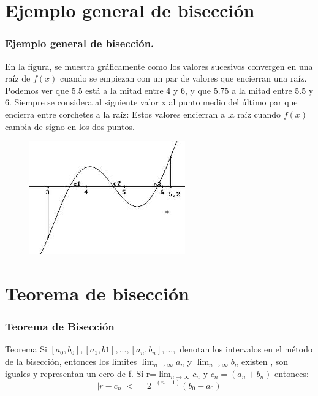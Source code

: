 \documentclass{beamer}
\begin{document}
\section{Ejemplo general de bisección}

\begin{frame}
\frametitle{Ejemplo general de bisección.}

\begin{block}{}
En la figura, se muestra gráficamente como los valores sucesivos convergen en una raíz de $f(x)$ cuando se empiezan con un par de valores que encierran una raíz. Podemos ver que 5.5 está a la mitad entre 4 y 6, y que 5.75 a la mitad entre 5.5 y 6. Siempre se considera al siguiente valor x al punto medio del último par que encierra entre corchetes a la raíz: Estos valores encierran a la raíz cuando $f(x)$ cambia de signo en los dos puntos.
\end{block}

\begin{figure}[b]
\begin{center}
\includegraphics[scale=0.4]{images.jpeg}
\end{center}
\end{figure}

\end{frame}

\section{Teorema de bisección}

\begin{frame}
\frametitle{Teorema de Bisección}
\begin{block}{Teorema}
Si $[a_0, b_0],[a_1,b1],...,[a_n,b_n],...,$ denotan los intervalos en el método de la bisección, entonces los límites $\lim_{n\rightarrow \infty} a_n$ y $\lim_{n\rightarrow \infty}b_n $ existen , son iguales y representan un cero de f. Si r=$\lim_{n\rightarrow \infty}c_n$ y $c_n=(a_n+b_n)$ entonces: $$|r-c_n|<=2^{-(n+1)} (b_0 - a_0)$$
\end{block}

\end{frame}
\end{document}
